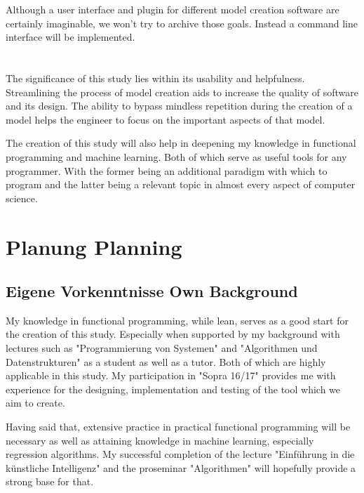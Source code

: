 \documentclass[10pt,a4paper,oneside]{scrartcl}
\begin{document}
	Although a user interface and plugin for different model creation software are certainly imaginable, we won't try to archive those goals. Instead a command line interface will be implemented.
	
	
	\section{}
	The significance of this study lies within its usability and helpfulness. Streamlining the process of model creation aids to increase the quality of software and its design. The ability to bypass mindless repetition during the creation of a model helps the engineer to focus on the important aspects of that model. 
	
	The creation of this study will also help in deepening my knowledge in functional programming and machine learning. Both of which serve as useful tools for any programmer. With the former being an additional paradigm with which to program and the latter being a relevant topic in almost every aspect of computer science.
	
	
	\section{
		{Planung}
		{Planning}}
	\label{sec:planning}
	
	\subsection{
		{Eigene Vorkenntnisse}
		{Own Background}}
	\label{sub:background}
	My knowledge in functional programming, while lean, serves as a good start for the creation of this study. Especially when supported by my background with lectures such as "Programmierung von Systemen" and "Algorithmen und Datenstrukturen" as a student as well as a tutor. Both of which are highly applicable in this study. My participation in "Sopra 16/17" provides me with experience for the designing, implementation and testing of the tool which we aim to create. 
	
	Having said that, extensive practice in practical functional programming will be necessary as well as attaining knowledge in machine learning, especially regression algorithms. My successful completion of the lecture "Einführung in die künstliche Intelligenz" and the proseminar "Algorithmen" will hopefully provide a strong base for that.
	
\end{document}
